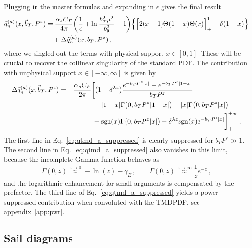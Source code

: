 \documentclass[11pt,a4paper]{article}
\DeclareRobustCommand{\eq}[1]{Eq.~\eqref{eq:#1}}
\DeclareRobustCommand{\app}[1]{appendix~\ref{app:#1}}
\newcommand{\eps}{\epsilon}
\newcommand{\nn}{\nonumber}
\newcommand{\as}{\alpha_s}
\newcommand{\Lb}[1]{\ln^{#1}\frac{b_T^2 \mu^2}{b_0^2}}
\newcommand{\bt}{\vec b_T}
\newcommand{\sgn}[1]{\mathrm{sgn}(#1)}
\newcommand{\plusinf}{_+^{\pm\infty}}
\begin{document}
Plugging in the master formulas and expanding in $\eps$ gives the final result
\begin{align} \label{eq:qtmd_a}
 \tilde q^{(a)}_n(x, \bt, P^z) &
 = \frac{\as C_F}{4\pi} \biggl(\frac{1}{\eps} + \Lb{} - 1 \biggr)
   \Bigl\{ \Bigl[ 2 (x-1) \Theta(1-x)\Theta(x) \Bigr]_+^1 - \delta(1-x) \Bigr\}
\nn\\&\quad
 + \Delta\tilde q^{(a)}_n(x, \bt, P^z)
\,,\end{align}
where we singled out the terms with physical support $x \in [0,1]$.
These will be crucial to recover the collinear singularity of the standard PDF.
The contribution with unphysical support $x \in [-\infty,\infty]$ is given by
\begin{align} \label{eq:qtmd_a_suppressed}
 \Delta\tilde q^{(a)}_n(x, \bt, P^z) &=
 - \frac{\as C_F}{2\pi} \biggl[
    (1 - \delta^{\lambda z}) \frac{e^{-b_T P^z |x|} - e^{-b_T P^z |1-x|}}{b_T P^z}
    \nn\\*&\hspace{1.75cm}
    + |1-x| \Gamma\bigl(0, b_T P^z |1-x|\bigr) - |x| \Gamma\bigl(0, b_T P^z |x|\bigr)
    \nn\\*&\hspace{1.75cm}
    + \sgn{x} \Gamma\bigl(0, b_T P^z |x|\bigr)
    - \delta^{\lambda z} \sgn{x} e^{- b_T P^z |x|} \biggr]\plusinf
\,.\end{align}
The first line in \eq{qtmd_a_suppressed} is clearly suppressed for $b_T P^z \gg 1$.
The second line in \eq{qtmd_a_suppressed} also vanishes in this limit, because the incomplete Gamma function behaves as
\begin{equation}
 \Gamma(0, z) \stackrel{z \to 0}{\approx} -\ln(z) - \gamma_E
\,,\qquad
 \Gamma(0, z) \stackrel{z \to \infty}{\approx} \frac{1}{z} e^{-z}
\,,\end{equation}
and the logarithmic enhancement for small arguments is compensated by the prefactor.
The third line of \eq{qtmd_a_suppressed} yields a power-suppressed contribution when convoluted with the TMDPDF, see \app{pwr}.


\subsection{Sail diagrams}
\end{document}
